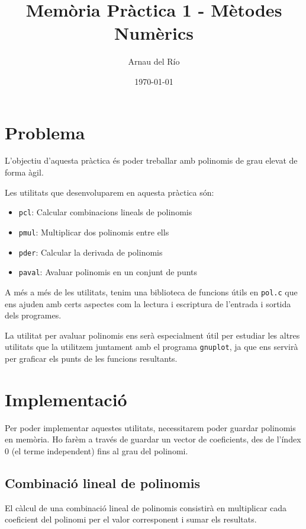 \documentclass[12pt,twoside,a4paper]{article}
\title{Memòria Pràctica 1 - Mètodes Numèrics}
\author{Arnau del Río}
\date{\today}
\begin{document}
\maketitle

\section{Problema}
L'objectiu d'aquesta pràctica és poder treballar amb polinomis de grau elevat de forma àgil.

Les utilitats que desenvoluparem en aquesta pràctica són:
\begin{itemize}
    \item \texttt{pcl}: Calcular combinacions lineals de polinomis
    \item \texttt{pmul}: Multiplicar dos polinomis entre ells
    \item \texttt{pder}: Calcular la derivada de polinomis
    \item \texttt{paval}: Avaluar polinomis en un conjunt de punts
\end{itemize}

A més a més de les utilitats, tenim una biblioteca de funcions útils en \texttt{pol.c} que ens ajuden amb certs aspectes com la lectura i escriptura de l'entrada i sortida dels programes.

La utilitat per avaluar polinomis ens serà especialment útil per estudiar les altres utilitats que la utilitzem juntament amb el programa \texttt{gnuplot}, ja que ens servirà per graficar els punts de les funcions resultants.

\newpage

\section{Implementació}
Per poder implementar aquestes utilitats, necessitarem poder guardar polinomis en memòria. Ho farèm a través de guardar un vector de coeficients, des de l'índex 0 (el terme independent) fins al grau del polinomi.

\subsection{Combinació lineal de polinomis}
El càlcul de una combinació lineal de polinomis consistirà en multiplicar cada coeficient del polinomi per el valor corresponent i sumar els resultats.
\end{document}
